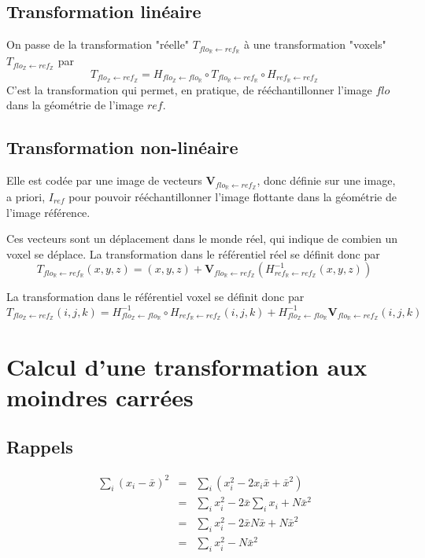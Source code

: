 \documentclass[10pt]{report}
\newcommand{\ens}[4]{ {#1}_{\mathbb{#2}} \leftarrow {#3}_{\mathbb{#4}} }
\begin{document}
\subsection{Transformation lin\'eaire}

On passe de la transformation "r\'eelle" $T_{\ens{flo}{R}{ref}{R}}$
\`a une transformation "voxels"  $T_{\ens{flo}{Z}{ref}{Z}}$ par
$$
T_{\ens{flo}{Z}{ref}{Z}} = 
H_{\ens{flo}{Z}{flo}{R}} \circ 
T_{\ens{flo}{R}{ref}{R}} \circ
H_{\ens{ref}{R}{ref}{Z}}
$$
C'est la transformation qui permet, en pratique, de r\'e\'echantillonner l'image $flo$ dans la g\'eom\'etrie de l'image $ref$.

\subsection{Transformation non-lin\'eaire}

Elle est cod\'ee par une image de vecteurs $\mathbf{V}_{\ens{flo}{R}{ref}{Z}}$, donc d\'efinie sur une image, a priori, $I_{ref}$ pour pouvoir r\'e\'echantillonner l'image flottante dans la g\'eom\'etrie de l'image r\'ef\'erence.

Ces vecteurs sont un d\'eplacement dans le monde r\'eel, qui indique de combien un voxel se d\'eplace.
La transformation dans le r\'ef\'erentiel r\'eel se d\'efinit donc par
$$
T_{\ens{flo}{R}{ref}{R}}(x,y,z) = (x,y,z) 
+ \mathbf{V}_{\ens{flo}{R}{ref}{Z}} \left( H^{-1}_{\ens{ref}{R}{ref}{Z}}(x,y,z) \right)
$$

La transformation dans le r\'ef\'erentiel voxel se d\'efinit donc par
$$
T_{\ens{flo}{Z}{ref}{Z}}(i,j,k) = 
H^{-1}_{\ens{flo}{Z}{flo}{R}}  \circ H_{\ens{ref}{R}{ref}{Z}} (i,j,k) 
+ H^{-1}_{\ens{flo}{Z}{flo}{R}}  \mathbf{V}_{\ens{flo}{R}{ref}{Z}} (i,j,k)
$$

\section{Calcul d'une transformation aux moindres carrées}

\subsection{Rappels}
\begin{eqnarray*}
\sum_i \left( x_i - \bar{x} \right)^2 
& = &
\sum_i \left( x_i^2 - 2 x_i \bar{x} + \bar{x}^2 \right) \\
& = &
\sum_i x_i^2 - 2 \bar{x} \sum_i x_i + N \bar{x}^2 \\
& = &
\sum_i x_i^2 - 2 \bar{x} N \bar{x} + N \bar{x}^2 \\
& = &
\sum_i x_i^2 - N \bar{x}^2 
\end{eqnarray*}
\end{document}
